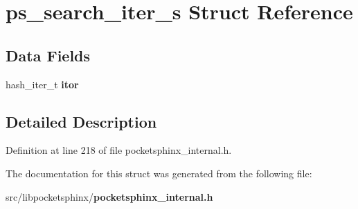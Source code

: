 \section{ps\+\_\+search\+\_\+iter\+\_\+s Struct Reference}
\label{structps__search__iter__s}
\subsection*{Data Fields}
\begin{DoxyCompactItemize}
\item 
hash\+\_\+iter\+\_\+t {\bfseries itor}\label{structps__search__iter__s_a08c98d4145043af325263a80020758f7}

\end{DoxyCompactItemize}


\subsection{Detailed Description}


Definition at line 218 of file pocketsphinx\+\_\+internal.\+h.



The documentation for this struct was generated from the following file\+:\begin{DoxyCompactItemize}
\item 
src/libpocketsphinx/{\bf pocketsphinx\+\_\+internal.\+h}\end{DoxyCompactItemize}
